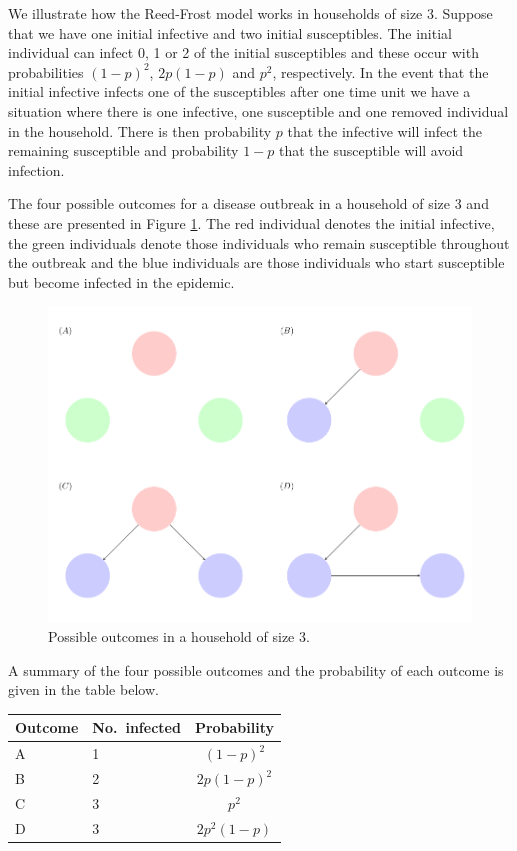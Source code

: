 \documentclass[
]{book}
\begin{document}
We illustrate how the Reed-Frost model works in households of size 3. Suppose that we have {one initial infective} and {two initial susceptibles}. The initial individual can infect 0, 1 or 2 of the initial susceptibles and these occur with probabilities \((1-p)^2\), \(2 p (1-p)\) and \(p^2\), respectively. In the event that the initial infective infects one of the susceptibles after one time unit we have a situation where there is one infective, one susceptible and one removed individual in the household. There is then probability \(p\) that the infective will infect the remaining susceptible and probability \(1-p\) that the susceptible will avoid infection.

The four possible outcomes for a disease outbreak in a household of size 3 and these are presented in Figure \ref{fig:RFoutcome}. The red individual denotes the initial infective, the green individuals denote those individuals who remain susceptible throughout the outbreak and the blue individuals are those individuals who start susceptible but become infected in the epidemic.

\begin{figure}
\includegraphics[width=0.8\linewidth]{RF} \caption{ Possible outcomes in a household of size 3.}\label{fig:RFoutcome}
\end{figure}

A summary of the four possible outcomes and the probability of each outcome is given in the table below.

\begin{longtable}[]{@{}llc@{}}
\toprule()
Outcome & No.~infected & Probability \\
\midrule()
\endhead
A & 1 & \((1-p)^2\) \\
B & 2 & \(2p(1-p)^2\) \\
C & 3 & \(p^2\) \\
D & 3 & \(2p^2(1-p)\) \\
\bottomrule()
\end{longtable}
\end{document}
